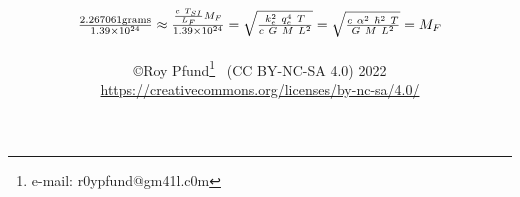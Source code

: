 
\usepackage{pst-node}%
\usepackage{tabu}
\usepackage{natbib}
\usepackage{graphicx}
\usepackage[colorlinks=true,linkcolor=black,anchorcolor=black,citecolor=black,filecolor=black,menucolor=black,runcolor=black,urlcolor=black]{hyperref}%
\title{${2.267061 \text{grams} \over \text{1.39}\times 10^{24}} \approx {{c ~ T_{SI}\over L_F}M_F \over \text{1.39}\times 10^{24}}=\sqrt{k_e^2~q_e^4~T \over c~G~M~L^2}= \sqrt{c ~\alpha^2 ~ \hbar^2 ~T\over G~M~L^2}=M_F$ }
\author{\copyright Roy Pfund\thanks{e-mail: r0ypfund@gm41l.c0m} ~(CC BY-NC-SA 4.0) 2022\\
\url{https://creativecommons.org/licenses/by-nc-sa/4.0/}}

